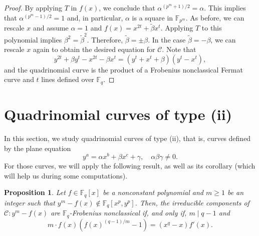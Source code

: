 \documentclass[preprint,12pt]{elsarticle}
\newtheorem{proposition}[theorem]{Proposition}
\begin{document}
\begin{proof}
    By applying $T$ in $f(x)$, we conclude that $\alpha^{(p^m+1)/2} = \alpha$. This implies that $\alpha^{(p^m - 1)/2} = 1$ and, in particular, $\alpha$ is a square in $\mathbb{F}_{p^m}$. As before, we can rescale $x$ and assume $\alpha = 1$ and $f(x) = x^{2t} + \tilde\beta x^t$. Applying $T$ to this polynomial implies $\beta^2 = \tilde\beta^2$. Therefore, $\tilde\beta = \pm \beta$. In the case $\tilde\beta = - \beta$, we can rescale $x$ again to obtain the desired equation for $\mathcal{C}$. Note that
    $$y^{2t}+\beta y^t - x^{2t} - \beta x^t = (y^t + x^t + \beta)(y^t - x^t),$$
    and the quadrinomial curve is the product of a Frobenius nonclassical Fermat curve and $t$ lines defined over $\mathbb{F}_q$.
\end{proof}

\section{Quadrinomial curves of type (ii)}\label{section:quadrinomial2}
In this section, we study quadrinomial curves of type (ii), that is, curves defined by the plane equation
$$
y^a = \alpha x^b + \beta x^c + \gamma, \quad \alpha\beta\gamma \neq 0.
$$
For those curves, we will apply the following result, as well as its corollary (which will help us during some computations).

\begin{proposition}\cite[Theorem 5.3]{borges-separated}\label{borges-condition}
    Let $f\in\mathbb{F}_q[x]$ be a nonconstant polynomial and $m\geq1$ be an integer such that $y^m-f(x)\notin\mathbb{F}_q[x^p,y^p]$. Then, the irreducible components of $\mathcal{C}: y^m-f(x)$ are $\mathbb{F}_q$-Frobenius nonclassical if, and only if, $m\mid q-1$ and $$m\cdot f(x)(f(x)^{(q-1)/m}-1)=(x^{q}-x)f'(x).$$
\end{proposition}
\end{document}

